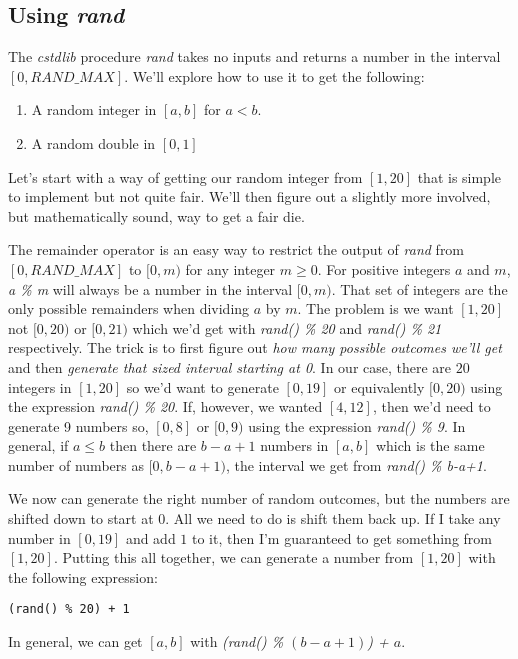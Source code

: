 \documentclass[]{tufte-handout}
\begin{document}
\subsection{Using \textit{rand}}

The \textit{cstdlib} procedure \textit{rand} takes no inputs and returns a number in the interval $[0,RAND\_MAX]$.  We'll explore how to use it to get the following:
\begin{enumerate}
\item A random integer in $[a,b]$ for $a < b$.
\item A random double in $[0,1]$
\end{enumerate}

Let's start with a way of getting our random integer from $[1,20]$ that is simple to implement but not quite fair. We'll then figure out a slightly more involved, but mathematically sound, way to get a fair die. 

The remainder operator\sidenote{\%} is an easy way to restrict the output of \textit{rand} from $[0,RAND\_MAX]$ to $[0,m)$ for any integer $m\geq 0$.  For positive integers $a$ and $m$, \textit{a \% m} will always be a number in the interval $[0,m)$. That set of integers are the only possible remainders when dividing $a$ by $m$.  The problem is we want $[1,20]$ not $[0,20)$ or $[0,21)$ which we'd get with \textit{rand() \% 20} and \textit{rand() \% 21} respectively.  The trick is to first figure out \textit{how many possible outcomes we'll get} and then \textit{generate that sized interval starting at 0}.  In our case, there are $20$ integers in $[1,20]$ so we'd want to generate $[0,19]$ or equivalently $[0,20)$ using the expression \textit{rand() \% 20}. If, however, we wanted $[4, 12]$, then we'd need to generate 9 numbers so, $[0,8]$ or $[0,9)$ using the expression \textit{rand() \% 9}.  In general, if $a\leq b$ then there are $b-a+1$ numbers in $[a,b]$ which is the same number of numbers as $[0,b-a+1)$, the interval we get from \textit{rand() \% b-a+1}.

We now can generate the right number of random outcomes, but the numbers are shifted down to start at $0$.  All we need to do is shift them back up.  If I take any number in $[0,19]$ and add $1$ to it, then I'm guaranteed to get something from $[1,20]$. Putting this all together, we can generate a number from $[1,20]$ with the following expression:
\begin{verbatim}
(rand() % 20) + 1
\end{verbatim} 
In general, we can get $[a,b]$ with \textit{(rand() \% $(b-a+1)$) + $a$}.
\end{document}
